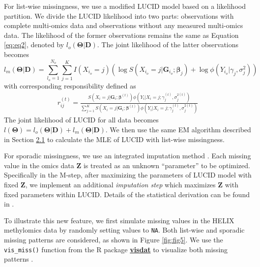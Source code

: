 For list-wise missingness, we use a modified LUCID model based on a
likelihood partition. We divide the LUCID likelihood into two parts:
observations with complete multi-omics data and observations without any
measured multi-omics data. The likelihood of the former observations
remains the same as Equation \eqref{eq:eq2}, denoted by
\(l_o (\boldsymbol{\mathbf{\Theta}}|\boldsymbol{\mathbf{D}})\). The joint
likelihood of the latter observations becomes
\[l_m(\boldsymbol{\mathbf{\Theta}}|\boldsymbol{\mathbf{D}}) = \sum_{l_o=1}^{N_o}\sum_{j=1}^K I(X_{i_o} = j) \left( \log S(X_{i_o} = j| \boldsymbol{\mathbf{G}}_{i_o};\boldsymbol{\mathbf{\beta}}_j) + \log \phi\left(Y_{i_o}|\gamma_j, \sigma_j^2\right)\right)
    \label{eq22}   \label{eq:eq22}\]
with corresponding responsibility defined as
\[\begin{aligned}
        r_{ij}^{(t)} = \frac{S\left(X_i = j| \boldsymbol{\mathbf{G}}_i; \boldsymbol{\mathbf{\beta}}^{(t)}\right) \phi\left(Y_i|X_i = j; \gamma_j^{(t)}, \sigma^{2(t)}_j \right)}{\sum_{j = 1}^K S\left(X_i = j| \boldsymbol{\mathbf{G}}_i; \boldsymbol{\mathbf{\beta}}^{(t)}\right) \phi \left(Y_i|X_i = j; \gamma_j^{(t)}, \sigma^{2(t)}_j\right)}
    \end{aligned}
    \label{eq23}   \label{eq:eq23}\]
The joint likelihood of LUCID for all data becomes
\(l(\boldsymbol{\mathbf{\Theta}}) = l_o (\boldsymbol{\mathbf{\Theta}}|\boldsymbol{\mathbf{D}}) +l_m (\boldsymbol{\mathbf{\Theta}}|\boldsymbol{\mathbf{D}})\).
We then use the same EM algorithm described in Section \hyperref[sec2.1]{2.1} to
calculate the MLE of LUCID with list-wise missingness.

For sporadic missingness, we use an integrated imputation method
\citep{zhang2021gaussian}. Each missing value in the omics data
\(\boldsymbol{\mathbf{Z}}\) is treated as an unknown ``parameter'' to be
optimized. Specifically in the M-step, after maximizing the parameters
of LUCID model with fixed \(\boldsymbol{\mathbf{Z}}\), we implement an
additional \emph{imputation step} which maximizes \(\boldsymbol{\mathbf{Z}}\)
with fixed parameters within LUCID. Details of the statistical
derivation can be found in \citet{zhang2021gaussian}.

To illustrate this new feature, we first simulate missing values in the
HELIX methylomics data by randomly setting values to \texttt{NA}. Both
list-wise and sporadic missing patterns are considered, as shown in
Figure \ref{fig:fig5}. We use the \texttt{vis\_miss()} function from the R
package \href{https://CRAN.R-project.org/package=visdat}{\textbf{visdat}} to
visualize both missing patterns \citep{visdat}.

